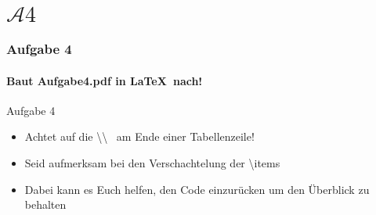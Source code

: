 \section{$\mathcal{A}4$} 
\begin{frame}
\frametitle{Aufgabe 4}
\framesubtitle{Baut Aufgabe4.pdf in \LaTeX ~nach!} 

\begin{block}{Aufgabe 4}
\begin{itemize}
  \item Achtet auf die \color{nounibaredII}\textbackslash \textbackslash  \color{black}~ am Ende einer Tabellenzeile!%
  \item Seid aufmerksam bei den Verschachtelung der \color{nounibaredII}\textbackslash item\color{black}s%
  \item Dabei kann es Euch helfen, den Code einzur\"ucken um den \"Uberblick zu behalten%
\end{itemize}
\end{block}
\end{frame}